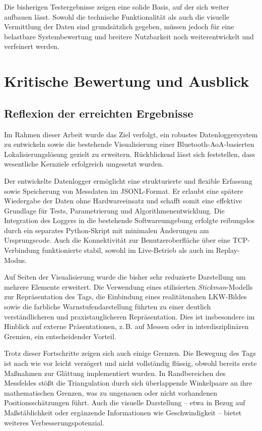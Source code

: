 \documentclass[a4paper, 12pt]{article} %
\begin{document}
Die bisherigen Testergebnisse zeigen eine solide Basis, auf der sich weiter aufbauen lässt. Sowohl die technische Funktionalität als auch die visuelle
 Vermittlung der Daten sind grundsätzlich gegeben, müssen jedoch für eine belastbare Systembewertung und breitere Nutzbarkeit noch weiterentwickelt und 
 verfeinert werden.

 \clearpage

\section{Kritische Bewertung und Ausblick}
\subsection{Reflexion der erreichten Ergebnisse}

Im Rahmen dieser Arbeit wurde das Ziel verfolgt, ein robustes Datenloggersystem zu entwickeln sowie die bestehende Visualisierung einer 
Bluetooth-AoA-basierten Lokalisierungslösung gezielt zu erweitern. Rückblickend lässt sich feststellen, dass wesentliche Kernziele erfolgreich 
umgesetzt wurden.

Der entwickelte Datenlogger ermöglicht eine strukturierte und flexible Erfassung sowie Speicherung von Messdaten im JSONL-Format. Er erlaubt eine 
spätere Wiedergabe der Daten ohne Hardwareeinsatz und schafft somit eine effektive Grundlage für Tests, Parametrierung und Algorithmenentwicklung. 
Die Integration des Loggers in die bestehende Softwareumgebung erfolgte reibungslos durch ein separates Python-Skript mit minimalen Änderungen am 
Ursprungscode. Auch die Konnektivität zur Benutzeroberfläche über eine TCP-Verbindung funktionierte stabil, sowohl im Live-Betrieb als auch im 
Replay-Modus.

Auf Seiten der Visualisierung wurde die bisher sehr reduzierte Darstellung um mehrere Elemente erweitert. Die Verwendung eines stilisierten 
\textit{Stickman}-Modells zur Repräsentation des Tags, die Einbindung eines realitätsnahen LKW-Bildes sowie die farbliche Warnstufendarstellung 
führten zu einer deutlich verständlicheren und praxistauglicheren Repräsentation. Dies ist insbesondere im Hinblick auf externe Präsentationen, 
z.\,B. auf Messen oder in interdisziplinären Gremien, ein entscheidender Vorteil.

Trotz dieser Fortschritte zeigen sich auch einige Grenzen. Die Bewegung des Tags ist nach wie vor leicht verzögert und nicht vollständig flüssig, 
obwohl bereits erste Maßnahmen zur Glättung implementiert wurden. In Randbereichen des Messfeldes stößt die Triangulation durch sich überlappende 
Winkelpaare an ihre mathematischen Grenzen, was zu ungenauen oder nicht vorhandenen Positionsschätzungen führt. Auch die visuelle Darstellung – etwa in 
Bezug auf Maßstäblichkeit oder ergänzende Informationen wie Geschwindigkeit – bietet weiteres Verbesserungspotenzial.
\end{document}
